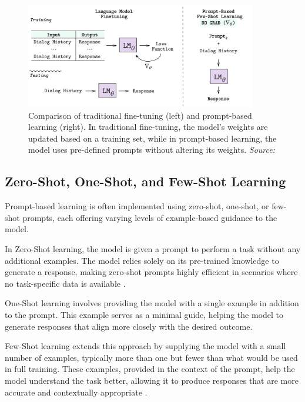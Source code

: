 \begin{figure}[h]
    \centering
    \includegraphics[width=0.9\textwidth]{images/llms/fine-tuning-vs-prompt-learning.png}
    \caption{Comparison of traditional fine-tuning (left) and prompt-based learning (right). In traditional fine-tuning, the model's weights are updated based on a training set, while in prompt-based learning, the model uses pre-defined prompts without altering its weights. \textit{Source:} \cite{madotto2021few}}
    \label{fig:fine_tuning_vs_prompt_learning}
\end{figure}

\subsection{Zero-Shot, One-Shot, and Few-Shot Learning}

Prompt-based learning is often implemented using zero-shot, one-shot, or few-shot prompts, each offering varying levels of example-based guidance to the model.

In Zero-Shot learning, the model is given a prompt to perform a task without any additional examples. The model relies solely on its pre-trained knowledge to generate a response, making zero-shot prompts highly efficient in scenarios where no task-specific data is available \cite{radford2019language}.

One-Shot learning involves providing the model with a single example in addition to the prompt. This example serves as a minimal guide, helping the model to generate responses that align more closely with the desired outcome.

Few-Shot learning extends this approach by supplying the model with a small number of examples, typically more than one but fewer than what would be used in full training. These examples, provided in the context of the prompt, help the model understand the task better, allowing it to produce responses that are more accurate and contextually appropriate \cite{brown2020language}.

